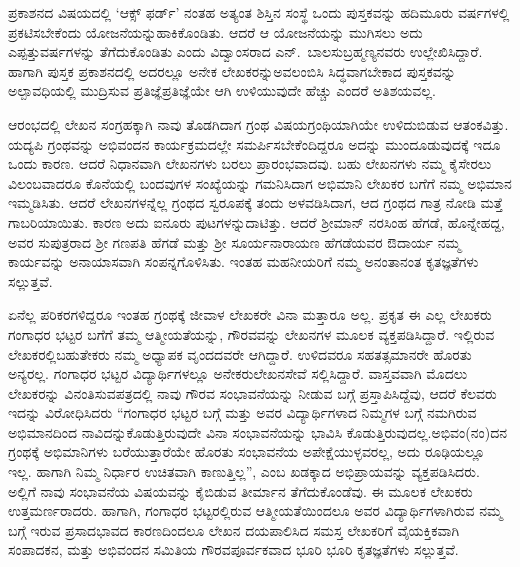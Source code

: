 {ಪ್ರಕಾಶನದ ವಿಷಯದಲ್ಲಿ ‘ಆಕ್ಸ್ ಫರ್ಡ್’ ನಂತಹ ಅತ್ಯಂತ ಶಿಸ್ತಿನ ಸಂಸ್ಥೆ ಒಂದು ಪುಸ್ತಕವನ್ನು ಹದಿಮೂರು ವರ್ಷಗಳಲ್ಲಿ ಪ್ರಕಟಿಸಬೇಕೆಂದು ಯೋಜನೆಯನ್ನು\break ಹಾಕಿಕೊಂಡಿತು. ಆದರೆ ಆ ಯೋಜನೆಯನ್ನು ಮುಗಿಸಲು ಅದು ಎಪ್ಪತ್ತು\break ವರ್ಷಗಳನ್ನು ತೆಗೆದುಕೊಂಡಿತು ಎಂದು ವಿದ್ವಾಂಸರಾದ ಎನ್.\ ಬಾಲಸುಬ್ರಹ್ಮಣ್ಯ\-ನವರು ಉಲ್ಲೇಖಿಸಿದ್ದಾರೆ. ಹಾಗಾಗಿ ಪುಸ್ತಕ ಪ್ರಕಾಶನದಲ್ಲಿ ಅದರಲ್ಲೂ ಅನೇಕ ಲೇಖಕರನ್ನು\break ಅವಲಂಬಿಸಿ ಸಿದ್ಧವಾಗಬೇಕಾದ ಪುಸ್ತಕವನ್ನು ಅಲ್ಪಾವಧಿಯಲ್ಲಿ ಮುದ್ರಿಸುವ ಪ್ರತಿಜ್ಞೆ\break ಪ್ರತಿಜ್ಞೆಯೇ ಆಗಿ ಉಳಿಯುವುದೇ ಹೆಚ್ಚು ಎಂದರೆ ಅತಿಶಯವಲ್ಲ. 

ಆರಂಭದಲ್ಲಿ ಲೇಖನ ಸಂಗ್ರಹಕ್ಕಾಗಿ ನಾವು ತೊಡಗಿದಾಗ ಗ್ರಂಥ ವಿಷಯ\break ಗ್ರಂಥಿಯಾಗಿಯೇ ಉಳಿದುಬಿಡುವ ಆತಂಕವಿತ್ತು. ಯದ್ಯಪಿ ಗ್ರಂಥವನ್ನು ಅಭಿವಂದನ ಕಾರ್ಯಕ್ರಮದಲ್ಲೇ ಸಮರ್ಪಿಸಬೇಕೆಂದಿದ್ದರೂ ಅದನ್ನು ಮುಂದೂಡುವುದಕ್ಕೆ ಇದೂ ಒಂದು ಕಾರಣ. ಆದರೆ ನಿಧಾನವಾಗಿ ಲೇಖನಗಳು ಬರಲು ಪ್ರಾರಂಭವಾದವು. ಬಹು ಲೇಖನಗಳು ನಮ್ಮ ಕೈಸೇರಲು ವಿಲಂಬವಾದರೂ ಕೊನೆಯಲ್ಲಿ ಬಂದವುಗಳ ಸಂಖ್ಯೆಯನ್ನು ಗಮನಿಸಿದಾಗ ಅಭಿಮಾನಿ ಲೇಖಕರ ಬಗೆಗೆ ನಮ್ಮ ಅಭಿಮಾನ ಇಮ್ಮಡಿಸಿತು. ಆದರೆ ಲೇಖನಗಳನ್ನೆಲ್ಲ ಗ್ರಂಥದ ಸ್ವರೂಪಕ್ಕೆ ತಂದು ಅಳವಡಿಸಿದಾಗ, ಆದ ಗ್ರಂಥದ ಗಾತ್ರ ನೋಡಿ ಮತ್ತೆ ಗಾಬರಿಯಾಯಿತು. ಕಾರಣ ಅದು ಐನೂರು ಪುಟಗಳನ್ನು\break ದಾಟಿತ್ತು. ಆದರೆ ಶ್ರೀಮಾನ್ ನರಸಿಂಹ ಹೆಗಡೆ, ಹೊನ್ನೇಹದ್ದ,  ಅವರ ಸುಪುತ್ರರಾದ ಶ್ರೀ ಗಣಪತಿ ಹೆಗಡೆ ಮತ್ತು ಶ್ರೀ ಸೂರ್ಯನಾರಾಯಣ ಹೆಗಡೆಯವರ ಔದಾರ್ಯ ನಮ್ಮ ಕಾರ್ಯವನ್ನು ಅನಾಯಾಸವಾಗಿ ಸಂಪನ್ನಗೊಳಿಸಿತು. ಇಂತಹ ಮಹನೀಯರಿಗೆ ನಮ್ಮ ಅನಂತಾನಂತ ಕೃತಜ್ಞತೆಗಳು ಸಲ್ಲುತ್ತವೆ. 

ಏನೆಲ್ಲ ಪರಿಕರಗಳಿದ್ದರೂ ಇಂತಹ ಗ್ರಂಥಕ್ಕೆ ಜೀವಾಳ ಲೇಖಕರೇ ವಿನಾ ಮತ್ತಾರೂ ಅಲ್ಲ. ಪ್ರಕೃತ ಈ ಎಲ್ಲ ಲೇಖಕರು ಗಂಗಾಧರ ಭಟ್ಟರ ಬಗೆಗೆ ತಮ್ಮ ಆತ್ಮೀಯತೆಯನ್ನು, ಗೌರವವನ್ನು ಲೇಖನಗಳ ಮೂಲಕ ವ್ಯಕ್ತಪಡಿಸಿದ್ದಾರೆ. ಇಲ್ಲಿರುವ ಲೇಖಕರಲ್ಲಿ\break ಬಹುತೇಕರು ನಮ್ಮ ಅಧ್ಯಾಪಕ ವೃಂದದವರೇ ಆಗಿದ್ದಾರೆ. ಉಳಿದವರೂ ಸಹ\break ತತ್ಸಮಾನರೇ ಹೊರತು ಅನ್ಯರಲ್ಲ. ಗಂಗಾಧರ ಭಟ್ಟರ ವಿದ್ಯಾರ್ಥಿಗಳಲ್ಲೂ ಅನೇಕರು\break ಲೇಖನಸೇವೆ ಸಲ್ಲಿಸಿದ್ದಾರೆ. ವಾಸ್ತವವಾಗಿ ಮೊದಲು ಲೇಖಕರನ್ನು ವಿನಂತಿಸುವ\break ಪತ್ರದಲ್ಲಿ ನಾವು ಗೌರವ ಸಂಭಾವನೆಯನ್ನು ನೀಡುವ ಬಗ್ಗೆ ಪ್ರಸ್ತಾಪಿಸಿದ್ದೆವು, ಆದರೆ ಕೆಲವರು ಇದನ್ನು ವಿರೋಧಿಸಿದರು \enginline{-} “ಗಂಗಾಧರ ಭಟ್ಟರ ಬಗ್ಗೆ ಮತ್ತು ಅವರ ವಿದ್ಯಾರ್ಥಿಗಳಾದ ನಿಮ್ಮಗಳ ಬಗ್ಗೆ ನಮಗಿರುವ ಅಭಿಮಾನದಿಂದ ನಾವಿದನ್ನು\break ಕೊಡುತ್ತಿರುವುದೇ ವಿನಾ ಸಂಭಾವನೆಯನ್ನು ಭಾವಿಸಿ ಕೊಡುತ್ತಿರುವುದಲ್ಲ.\break ಅಭಿವಂ(ನಂ)ದನ ಗ್ರಂಥಕ್ಕೆ ಅಭಿಮಾನಿಗಳು ಬರೆಯುತ್ತಾರೆಯೇ ಹೊರತು ಸಂಭಾವನೆಯ ಅಪೇಕ್ಷೆಯುಳ್ಳವರಲ್ಲ, ಅದು ರೂಢಿಯಲ್ಲೂ ಇಲ್ಲ. ಹಾಗಾಗಿ ನಿಮ್ಮ ನಿರ್ಧಾರ ಉಚಿತವಾಗಿ ಕಾಣುತ್ತಿಲ್ಲ”, ಎಂಬ ಖಡಕ್ಕಾದ ಅಭಿಪ್ರಾಯವನ್ನು ವ್ಯಕ್ತಪಡಿಸಿದರು. ಅಲ್ಲಿಗೆ ನಾವು ಸಂಭಾವನೆಯ ವಿಷಯವನ್ನು ಕೈಬಿಡುವ ತೀರ್ಮಾನ ತೆಗೆದುಕೊಂಡೆವು. ಈ ಮೂಲಕ ಲೇಖಕರು ಉತ್ತಮರ್ಣರಾದರು. ಹಾಗಾಗಿ, ಗಂಗಾಧರ ಭಟ್ಟರಲ್ಲಿರುವ ಆತ್ಮೀಯತೆಯಿಂದಲೂ ಅವರ ವಿದ್ಯಾರ್ಥಿಗಳಾಗಿರುವ ನಮ್ಮ ಬಗ್ಗೆ ಇರುವ ಪ್ರಸಾದ\break ಭಾವದ ಕಾರಣದಿಂದಲೂ ಲೇಖನ ದಯಪಾಲಿಸಿದ ಸಮಸ್ತ ಲೇಖಕರಿಗೆ ವೈಯಕ್ತಿಕವಾಗಿ ಸಂಪಾದಕನ, ಮತ್ತು ಅಭಿವಂದನ ಸಮಿತಿಯ ಗೌರವಪೂರ್ವಕವಾದ ಭೂರಿ ಭೂರಿ ಕೃತಜ್ಞತೆಗಳು ಸಲ್ಲುತ್ತವೆ.

}

